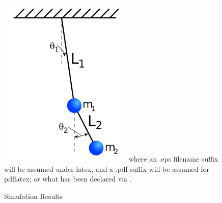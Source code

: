 \documentclass[journal]{IEEEtran}
\begin{document}
\begin{figure}[!t]
\centering
\includegraphics[width=2.5in]{dpend.png}
where an .eps filename suffix will be assumed under latex,
and a .pdf suffix will be assumed for pdflatex; or what has been declared
via \DeclareGraphicsExtensions.
\caption{Simulation Results}
\label{fig_sim}
\end{figure}



%
%
\end{document}
